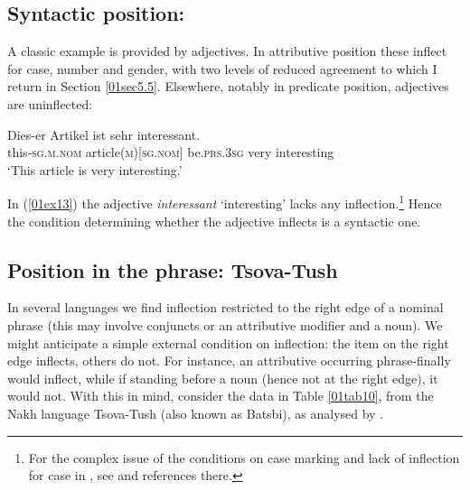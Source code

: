 \documentclass[output=paper,colorlinks,citecolor=brown]{langscibook}
\begin{document}
\subsection{Syntactic position: } \label{01sec5.1}

A classic example is provided by  adjectives. In attributive position these inflect for case, number and gender, with two levels of reduced agreement \citep[95--96]{corbett2006} to which I return in Section \ref{01sec5.5}. Elsewhere, notably in predicate position, adjectives are uninflected:

\begin{exe}
	\ex \label{01ex13}
	\gll Dies-er Artikel ist sehr interessant. \\
	this-\textsc{sg.m.nom} article\textsc{(m)[sg.nom]} be.\textsc{prs.3sg} very interesting \\
	\trans ‘This article is very interesting.’
\end{exe}

In (\ref{01ex13}) the adjective \textit{interessant} `interesting' lacks any inflection.\footnote{For the complex issue of the conditions on case marking and lack of inflection for case in , see \citet{spencer2009} and references there.} Hence the condition determining whether the adjective inflects is a syntactic one.

\subsection{Position in the phrase: Tsova-Tush} \label{01sec5.2}

In several languages we find inflection restricted to the right edge of a nominal phrase (this may involve conjuncts or an attributive modifier and a noun). We might anticipate a simple external condition on inflection: the item on the right edge inflects, others do not. For instance, an attributive occurring phrase-finally would inflect, while if standing before a noun (hence not at the right edge), it would not. With this in mind, consider the data in Table \ref{01tab10}, from the Nakh language Tsova-Tush (also known as Batsbi), as analysed by \citet{simswilliamsbaerman2021}.
\end{document}
